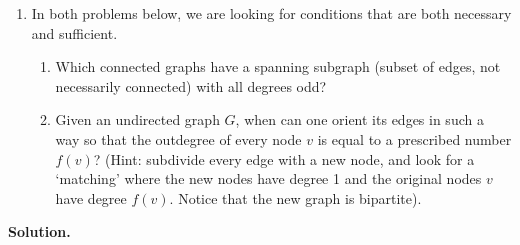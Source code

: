 \documentclass[11pt,letterpaper]{article}
\theoremstyle{definition}
\newcommand{\solution}{\medskip\noindent\textbf{Solution.}\par\medskip}
\begin{document}
\begin{enumerate}[resume=q]
\item[10.**] In both problems below, we are looking for conditions that are both necessary and sufficient.
\begin{enumerate}
\item Which connected graphs have a spanning subgraph (subset of edges, not necessarily connected) with all degrees odd?
\item Given an undirected graph $G$, when can one orient its edges in such a way so that the outdegree of every node $v$ is equal to a prescribed number $f(v)$? (Hint: subdivide every edge with a new node, and look for a `matching' where the new nodes have degree 1 and the original nodes $v$ have degree $f(v)$. Notice that the new graph is bipartite).
\end{enumerate}
\end{enumerate}

\solution
\end{document}
